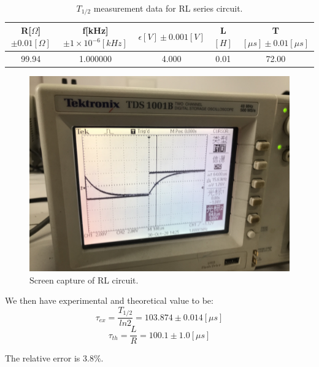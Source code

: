 \documentclass[12pt,a4paper]{article}
\begin{document}
\begin{table}[H]
    \centering
    \begin{tabular}{ccccc}
    \hline
    R{[}$\Omega${]}$\pm 0.01[\Omega]$ & f{[}kHz{]}$\pm 1\times 10^{-6}[kHz]$ & $\epsilon[V]\pm 0.001[V]$ & L$[H]$ & T$[\mu s]\pm 0.01[\mu s]$ \\ \hline
    99.94                             & 1.000000                             & 4.000                     & 0.01    & 72.00                     \\ \hline
    \end{tabular}
    \caption{$T_{1/2}$ measurement data for RL series circuit.}
    \label{T1/2 measurement data for RL series circuit.}
\end{table}
\begin{figure}[H]
    \centering
    \includegraphics[scale=0.08]{p2.jpeg}
    \caption{Screen capture of RL circuit.}
    \label{Screen capture of RL circuit.}
\end{figure}
\par We then have experimental and theoretical value to be:
$$\tau_{ex}=\frac{T_{1/2}}{ln2}=103.874\pm 0.014[\mu s]$$
$$\tau_{th}=\frac{L}{R}=100.1\pm 1.0[\mu s]$$
\par The relative error is $3.8\%$.
\end{document}
